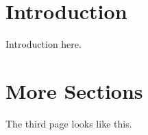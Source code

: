 \documentclass[12pt, a4paper]{article}
\newcommand{\cntext}[1]{\begin{CJK*}{UTF8}{bkai}#1\end{CJK*}}
\begin{document}
%
%

\begin{abstract}
Proposal abstract.

\cntext{中文摘要。}

\end{abstract}

%
%
\section{Introduction}

Introduction here.

\clearpage

\section{More Sections}

The third page looks like this. 

%
%
 \clearpage
\renewcommand\bibsection{\section*{REFERENCES}}
\setlength{\bibsep}{2pt}
%
\end{document}

